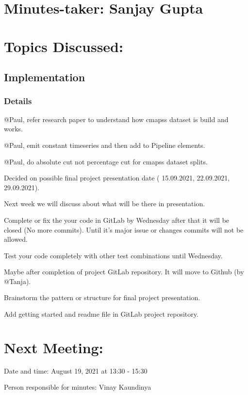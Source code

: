 \documentclass[11pt]{meetingmins} %
\begin{document}
\maketitle

\section{Minutes-taker: Sanjay Gupta}

\section{Topics Discussed:}

\subsection{Implementation}
\subsubsection{Details}
\begin{hiddensubitems}
    \item @Paul, refer research paper to understand how cmapss dataset is build and works.
    \item @Paul, emit constant timeseries and then add to Pipeline elements.
    \item @Paul, do absolute cut not percentage cut for cmapss dataset splits.
    \item Decided on possible final project presentation date ( 15.09.2021, 22.09.2021, 29.09.2021).
    \item Next week we will discuss about what will be there in presentation.
    \item Complete or fix the your code in GitLab by Wednesday after that it will be closed (No more commits). Until it's major issue or changes commits will not be allowed.
    \item Test your code completely with other test combinations until Wednesday.
    \item Maybe after completion of project GitLab repository. It will move to Github (by @Tanja).
    \item Brainstorm the pattern or structure for final project presentation.
    \item Add getting started and readme file in GitLab project repository.
\end{hiddensubitems}

\section{Next Meeting:}
\begin{hiddensubitems}
    \item Date and time: August 19, 2021 at 13:30 - 15:30
    \item Person responsible for minutes: Vinay Kaundinya
\end{hiddensubitems}
\end{document}
